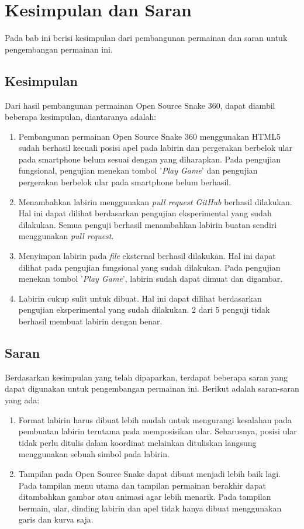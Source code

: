 \chapter{Kesimpulan dan Saran}
\label{chap:kesimpulansaran}

Pada bab ini berisi kesimpulan dari pembangunan permainan dan saran untuk pengembangan permainan ini.

\section{Kesimpulan}
Dari hasil pembangunan permainan Open Source Snake 360, dapat diambil beberapa kesimpulan, diantaranya adalah: 

\begin{enumerate}
	\item Pembangunan permainan Open Source Snake 360 menggunakan HTML5 sudah berhasil kecuali posisi apel pada labirin dan pergerakan berbelok ular pada smartphone belum sesuai dengan yang diharapkan. Pada pengujian fungsional, pengujian menekan tombol '\textit{Play Game}' dan pengujian pergerakan berbelok ular pada smartphone belum berhasil.
	\item Menambahkan labirin menggunakan \textit{pull request GitHub} berhasil dilakukan. Hal ini dapat dilihat berdasarkan pengujian eksperimental yang sudah dilakukan. Semua penguji berhasil menambahkan labirin buatan sendiri menggunakan \textit{pull request}.
	\item Menyimpan labirin pada \textit{file} eksternal berhasil dilakukan. Hal ini dapat dilihat pada pengujian fungsional yang sudah dilakukan. Pada pengujian menekan tombol '\textit{Play Game}', labirin sudah dapat dimuat dan digambar.
	\item Labirin cukup sulit untuk dibuat. Hal ini dapat dilihat berdasarkan pengujian eksperimental yang sudah dilakukan. 2 dari 5 penguji tidak berhasil membuat labirin dengan benar.
\end{enumerate} 

\section{Saran}
Berdasarkan kesimpulan yang telah dipaparkan, terdapat beberapa saran yang dapat digunakan untuk pengembangan permainan ini. Berikut adalah saran-saran yang ada:

\begin{enumerate}
	\item Format labirin harus dibuat lebih mudah untuk mengurangi kesalahan pada pembuatan labirin terutama pada memposisikan ular. Seharusnya, posisi ular tidak perlu ditulis dalam koordinat melainkan dituliskan langsung menggunakan sebuah simbol pada labirin.
	\item Tampilan pada Open Source Snake dapat dibuat menjadi lebih baik lagi. Pada tampilan menu utama dan tampilan permainan berakhir dapat ditambahkan gambar atau animasi agar lebih menarik. Pada tampilan bermain, ular, dinding labirin dan apel tidak hanya dibuat menggunakan garis dan kurva saja.
\end{enumerate}